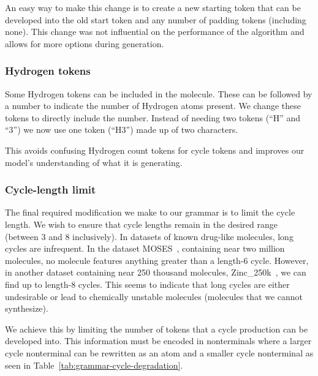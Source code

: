 \documentclass[../Document.tex]{subfiles}
\begin{document}
An easy way to make this change is to create a new starting token that can be developed into the old start token and any number of padding tokens (including none). This change was not influential on the performance of the algorithm and allows for more options during generation.


\subsubsection{Hydrogen tokens}
Some Hydrogen tokens can be included in the molecule. These can be followed by a number to indicate the number of Hydrogen atoms present. We change these tokens to directly include the number.
Instead of needing two tokens (``H'' and ``3'') we now use one token (``H3'') made up of two characters.

This avoids confusing Hydrogen count tokens for cycle tokens and improves our model's understanding of what it is generating.


\subsubsection{Cycle-length limit}
The final required modification we make to our grammar is to limit the cycle length.
We wish to ensure that cycle lengths remain in the desired range (between 3 and 8 inclusively).
In datasets of known drug-like molecules, long cycles are infrequent.
In the dataset MOSES~\cite{MOSES}, containing near two million molecules, no molecule features anything greater than a length-6 cycle. However, in another dataset containing near 250 thousand molecules, Zinc\_250k~\cite{Akhmetshin2021}, we can find up to length-8 cycles.
This seems to indicate that long cycles are either undesirable or lead to chemically unstable molecules (\ie molecules that we cannot synthesize).

We achieve this by limiting the number of tokens that a cycle production can be developed into. This information must be encoded in nonterminals where a larger cycle nonterminal can be rewritten as an atom and a smaller cycle nonterminal as seen in Table~\ref{tab:grammar-cycle-degradation}.
\end{document}
